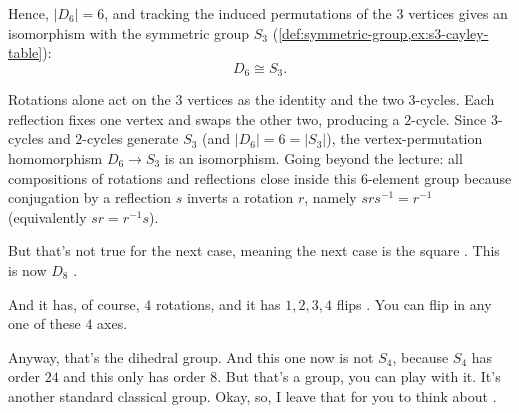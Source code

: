 \begin{content}
\begin{example}
Hence, $|D_6| = 6$, and tracking the induced permutations of the $3$ vertices gives an isomorphism with the symmetric group $S_3$ (\cref{def:symmetric-group,ex:s3-cayley-table}):
\[
D_6 \cong S_3.
\]
\end{example}

\begin{steps}
Rotations alone act on the $3$ vertices as the identity and the two $3$-cycles. Each reflection fixes one vertex and swaps the other two, producing a $2$-cycle. Since $3$-cycles and $2$-cycles generate $S_3$ (and $|D_6| = 6 = |S_3|$), the vertex-permutation homomorphism $D_6 \to S_3$ is an isomorphism. Going beyond the lecture: all compositions of rotations and reflections close inside this $6$-element group because conjugation by a reflection $s$ inverts a rotation $r$, namely $s r s^{-1} = r^{-1}$ (equivalently $sr = r^{-1}s$).
\end{steps}
\end{content}

\begin{speech}[00:29:07 - 00:29:42]
But that's not true for the next case, meaning the next case is the square . This is now $D_8$ .

And it has, of course, $4$ rotations, and it has $1, 2, 3, 4$ flips . You can flip in any one of these $4$ axes.

Anyway, that's the dihedral group. And this one now is not $S_4$, because $S_4$ has order $24$ and this only has order $8$. But that's a group, you can play with it. It's another standard classical group. Okay, so, I leave that for you to think about .
\end{speech}

